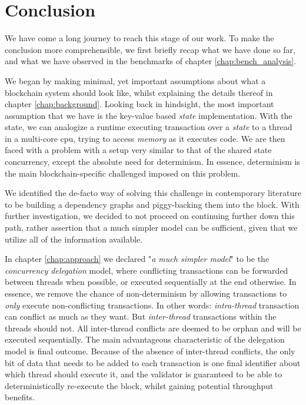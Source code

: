 \chapter{Conclusion} \label{chap:conclusion}

We have come a long journey to reach this stage of our work. To make the conclusion more
comprehensible, we first briefly recap what we have done so far, and what we have observed in the
benchmarks of chapter \ref{chap:bench_analysis}.

We began by making minimal, yet important assumptions about what a blockchain system should look
like, whilst explaining the details thereof in chapter \ref{chap:background}. Looking back in
hindsight, the most important assumption that we have is the key-value based \textit{state}
implementation. With the state, we can analogize a runtime executing transaction over a
\textit{state} to a thread in a multi-core cpu, trying to access \textit{memory} as it executes
code. We are then faced with a problem with a setup very similar to that of the shared state
concurrency, except the absolute need for determinism. In essence, determinism is the main
blockchain-specific challenged imposed on this problem.

We identified the de-facto way of solving this challenge in contemporary literature to be building a
dependency graphs and piggy-backing them into the block. With further investigation, we decided to
not proceed on continuing further down this path, rather assertion that a much simpler model can be
sufficient, given that we utilize all of the information available.

In chapter \ref{chap:approach} we declared "\textit{a much simpler model}" to be the
\textit{concurrency delegation} model, where conflicting transactions can be forwarded between
threads when possible, or executed sequentially at the end otherwise. In essence, we remove the
chance of non-determinism by allowing transactions to \textit{only} execute non-conflicting
transactions. In other words: \textit{intra-thread} transaction can conflict as much as they want.
But \textit{inter-thread} transactions within the threads should not. All inter-thread conflicts are
deemed to be orphan and will be executed sequentially. The main advantageous characteristic of the
delegation model is final outcome. Because of the absence of inter-thread conflicts, the only bit of
data that needs to be added to each transaction is one final identifier about which thread should
execute it, and the validator is guaranteed to be able to deterministically re-execute the block,
whilst gaining potential throughput benefits.

